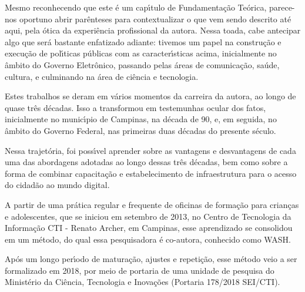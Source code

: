 \documentclass[
12pt,		%
openright,	%
twoside,  %
a4paper,			%
chapter=TITLE,		%
english,			%
french,				%
spanish,			%
brazil				%
]{USPSC-classe/USPSC}
\begin{document}
Mesmo reconhecendo que este \'e um cap\'{\i}tulo de Fundamenta\c{c}\~ao Te\'orica, parece-nos oportuno abrir par\^enteses para contextualizar o que vem sendo descrito at\'e aqui, pela \'otica da experi\^encia profissional da autora. Nessa toada, cabe antecipar algo que ser\'a bastante enfatizado adiante: tivemos um papel na constru\c{c}\~ao e execu\c{c}\~ao de pol\'{\i}ticas p\'ublicas com as caracter\'{\i}sticas acima, inicialmente no \^ambito do Governo Eletr\^onico, passando pelas \'areas de comunica\c{c}\~ao, sa\'ude, cultura, e culminando na \'area de ci\^encia e tecnologia.








Estes trabalhos se deram em v\'arios momentos da carreira da autora, ao longo de quase tr\^es d\'ecadas. Isso a transformou em testemunhas ocular dos fatos, inicialmente no  munic\'{\i}pio de Campinas, na d\'ecada de 90, e, em seguida, no \^ambito do Governo Federal, nas primeiras duas d\'ecadas do presente s\'eculo.








Nessa trajet\'oria, foi poss\'{\i}vel aprender sobre as vantagens e desvantagens de cada uma das abordagens adotadas ao longo dessas tr\^es d\'ecadas, bem como sobre a forma de combinar capacita\c{c}\~ao e estabelecimento de infraestrutura para o acesso do cidad\~ao ao mundo digital.








A partir de uma pr\'atica regular e frequente de oficinas de forma\c{c}\~ao para  crian\c{c}as e adolescentes, que se iniciou em setembro de 2013, no Centro de Tecnologia da Informa\c{c}\~ao CTI - Renato Archer, em Campinas, esse aprendizado se consolidou em um m\'etodo, do qual essa pesquisadora \'e co-autora, conhecido como WASH.








Ap\'os um longo per\'{\i}odo de matura\c{c}\~ao, ajustes e repeti\c{c}\~ao, esse m\'etodo veio a ser formalizado em 2018, por meio de portaria de uma unidade de pesquisa do Minist\'erio da Ci\^encia, Tecnologia e Inova\c{c}\~oes (Portaria 178/2018 SEI/CTI).
\end{document}
